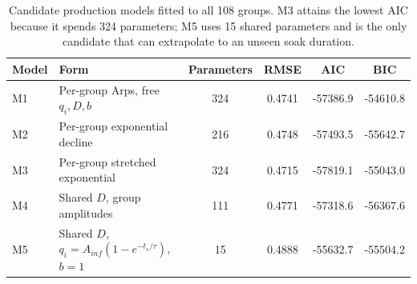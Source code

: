 \begin{table}[htbp]
\centering
\caption{Candidate production models fitted to all 108 groups. M3 attains the lowest AIC because it spends 324 parameters; M5 uses 15 shared parameters and is the only candidate that can extrapolate to an unseen soak duration.}
\label{tab:modelsel}
\small
\begin{tabular}{@{}llcccc@{}}
\toprule
Model & Form & Parameters & RMSE & AIC & BIC \\
\midrule
M1 & Per-group Arps, free $q_i,D,b$ & 324 & 0.4741 & -57386.9 & -54610.8 \\
M2 & Per-group exponential decline & 216 & 0.4748 & -57493.5 & -55642.7 \\
M3 & Per-group stretched exponential & 324 & 0.4715 & -57819.1 & -55043.0 \\
M4 & Shared $D$, group amplitudes & 111 & 0.4771 & -57318.6 & -56367.6 \\
M5 & Shared $D$, $q_i=A_{inf}(1-e^{-t_s/\tau})$, $b=1$ & 15 & 0.4888 & -55632.7 & -55504.2 \\
\bottomrule
\end{tabular}
\end{table}
